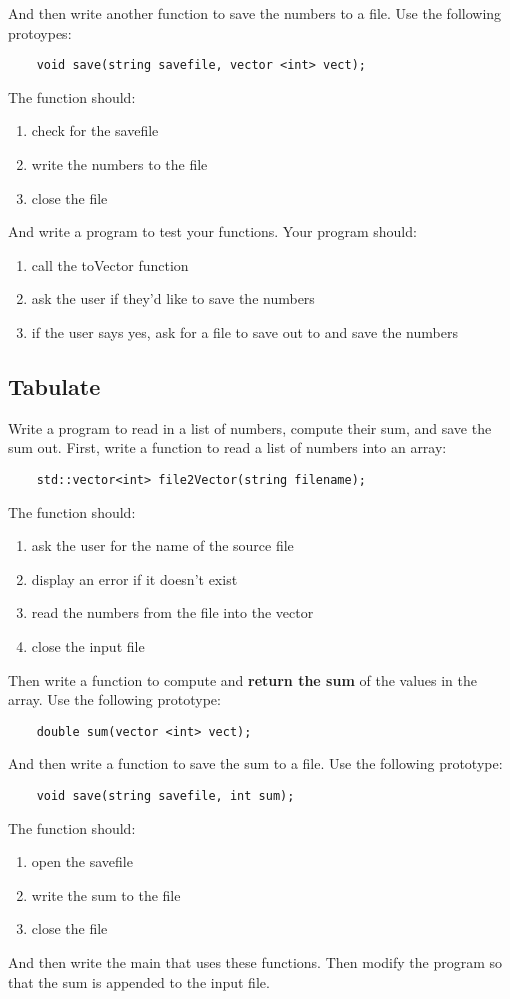 \documentclass{article}
\begin{document}
 And then write another function to save the numbers to a file. Use the following protoypes:
\begin{verbatim}
	void save(string savefile, vector <int> vect);
\end{verbatim}
The function should:
\begin{enumerate}
	\item check for the savefile
	\item write the numbers to the file
	\item close the file
\end{enumerate}
And write a program to test your functions. Your program should:
\begin{enumerate}
	\item call the toVector function
	\item ask the user if they'd like to save the numbers
	\item if the user says yes, ask for a file to save out to and save the numbers
\end{enumerate}

\subsection{Tabulate}
Write a program to read in a list of numbers, compute their sum, and save the sum out. First, write a function to read a list of numbers into an array:
\begin{verbatim}
	std::vector<int> file2Vector(string filename);
\end{verbatim}
The function should:
\begin{enumerate}
	\item ask the user for the name of the source file
	\item display an error if it doesn't exist
	\item read the numbers from the file into the vector
	\item close the input file
\end{enumerate}
Then write a function to compute and \textbf{return the sum} of the values in the array. Use the following prototype:
\begin{lstlisting}
	double sum(vector <int> vect);
\end{lstlisting}
And then write a function to save the sum to a file. Use the following prototype:
\begin{verbatim}
	void save(string savefile, int sum);
\end{verbatim}
The function should:
\begin{enumerate}
	\item open the savefile
	\item write the sum to the file
	\item close the file
\end{enumerate}
And then write the main that uses these functions. Then modify the program so that the sum is appended to the input file.
\end{document}
